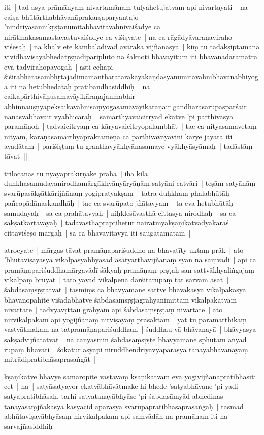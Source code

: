 \documentclass[article,12pt,a4paper]{memoir}
\newcommand{\name}[1]{#1}
\newcommand{\persName}[1]{#1}
\begin{document}
	

	  \pstart iti | tad asya prāmāṇyaṃ nivartamānaṃ tulyahetujatvam api nivartayati | na caiṣa bhūtārthabhāvanāprakarṣaparyantajo 'nindriyasannikṛṣṭānumitabhāvitavahnivaiśadye ca nirātmakasamastavastuvaiśadye ca viśiṣyate | na ca rāgādyāvaraṇaviraho viśeṣaḥ | na khalv ete kambalādivad āvarakā vijñānasya | kiṃ tu tadākṣiptamanā vividhaviṣayabhedatṛṣṇādiparipluto na śaknoti bhāvayitum iti bhāvanādaramātra eva tadvirahopayogaḥ | asti cehāpi śiśirabharasambhṛtajaḍimamantharatarakāyakāṇḍasyānumitavahnibhāvanābhiyoga iti na hetubhedataḥ pratibandhasiddhiḥ | na caikapārthivāṇusamavāyikāraṇajanmabhir abhinnauṣṇyāpekṣaikavahnisaṃyogāsamavāyikāraṇair gandharasarūpasparśair nānāsvabhāvair vyabhicāraḥ | sāmarthyavaicitryād ekatve 'pi pārthivasya paramāṇoḥ | tadvaicitryaṃ ca kāryavaicitryopalambhāt | tac ca nityasamavetaṃ nityam, kāraṇasāmarthyaprakrameṇa ca pārthivāvayavini kārye jāyata iti avadātam | pariśiṣṭaṃ tu granthavyākhyānasamaye vyākhyāsyāmaḥ | tadāstāṃ tāvat || 
	\pend
      

	  \pstart \persName{trilocanas} tu \name{nyāyaprakīrṇake} prāha | iha kila duḥkhasamudayanirodhamārgākhyānyāryāṇāṃ satyāni catvāri | teṣām satyānāṃ svarūpasākṣātkārijñānaṃ yogipratyakṣaṃ | tatra duḥkhaṃ phalabhūtāḥ pañcopādānaskandhāḥ | tac ca svarūpato jñātavyam | ta eva hetubhūtāḥ samudayaḥ | sa ca prahātavyaḥ | niḥkleśāvasthā cittasya nirodhaḥ | sa ca sākṣātkartavayaḥ | tadavasthāprāptihetur nairātmyakṣaṇikatvādyākāraś cittaviśeṣo mārgaḥ | sa ca bhāvayitavya iti saugatamatam |
	\pend
      

	  \pstart atrocyate | mārgas tāvat pramāṇapariśuddho na bhavatīty uktaṃ prāk | ato 'bhūtaviṣayasya vikalpasyābhyāsād asatyārthavijñānaṃ syān na saṃvādi | api ca pramāṇapariśuddhamārgavādī śākyaḥ pramāṇaṃ pṛṣṭaḥ san sattvākhyaliṅgajaṃ vikalpaṃ brūyāt | tato yāvad vikalpena darśitarūpaṃ tat sarvam asat | śabdasaṃsṛṣṭatvāt | tasmiṃs ca bhāvyamāne sattve bhāvakasya vikalpakasya bhāvanopahite viśadābhatve śabdasamsṛṣṭagrāhyanimittaṃ vikalpakatvaṃ nivartate | tadvyāvṛttau grāhyam api śabdasaṃsṛṣṭaṃ nivartate | ato nirvikalpakam api yogijñānaṃ nirviṣayaṃ prasaktam | yat tu pāramārthikaṃ vastvātmakaṃ na tatpramāṇapariśuddham | śuddhau vā bhāvanayā | bhāvyasya sākṣādvijñātatvāt | na cānyasmin śabdasaṃsṛṣṭe bhāvyamāne sphuṭam anyad rūpaṃ bhavati | śokātur asyāpi niruddhendriyavyāpārasya tanayabhāvanāyāṃ mitrādipratibhāsaprasaṅgāt | 
	\pend
      

	  \pstart kṣaṇikatve bhāvye samāropite vāstavaṃ kṣaṇikatvam eva yogivijñānapratibhāsīti cet | na | satyāsatyayor ekatvābhāvātmake hi bhede 'satyabhāvane 'pi yadi satyapratibhāsaḥ, tarhi satyatanayābhyāse 'pi śabdasāmyād abhedinas tanayasaṃjñakasya kasyacid aparasya svarūpapratibhāsaprasaṅgaḥ | tasmād abhūtaviṣayābhyāsaṃ nirvikalpakam api saṃvādān na pramāṇam iti na sarvajñasiddhiḥ | 
	\pend
      
\end{document}

